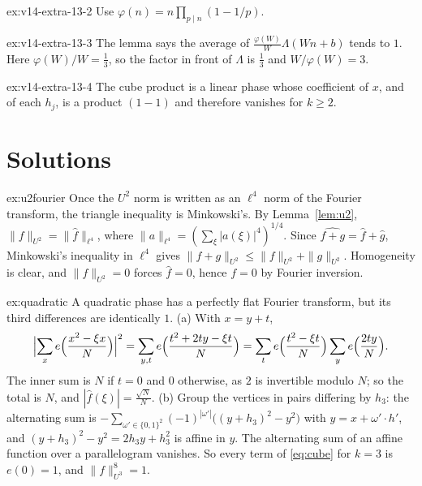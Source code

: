 \begin{hint}{ex:v14-extra-13-2}
Use $\varphi(n)=n\prod_{p\mid n}(1-1/p)$.
\end{hint}

\begin{hint}{ex:v14-extra-13-3}
The lemma says the average of $\frac{\varphi(W)}W\Lambda(Wn+b)$ tends to $1$. Here $\varphi(W)/W=\frac13$, so the factor in front of $\Lambda$ is $\frac13$ and $W/\varphi(W)=3$.
\end{hint}

\begin{hint}{ex:v14-extra-13-4}
The cube product is a linear phase whose coefficient of $x$, and of each $h_j$, is a product $(1-1)$ and therefore vanishes for $k\ge2$.
\end{hint}

\section{Solutions}

\begin{solution}{ex:u2fourier}
\idea Once the $U^2$ norm is written as an $\ell^4$ norm of the Fourier transform, the triangle inequality is Minkowski's.
\writeup By Lemma~\ref{lem:u2}, $\|f\|_{U^2}=\|\hat f\|_{\ell^4}$, where $\|a\|_{\ell^4}=(\sum_\xi|a(\xi)|^4)^{1/4}$. Since $\widehat{f+g}=\hat f+\hat g$, Minkowski's inequality in $\ell^4$ gives $\|f+g\|_{U^2}\le\|f\|_{U^2}+\|g\|_{U^2}$. Homogeneity is clear, and $\|f\|_{U^2}=0$ forces $\hat f=0$, hence $f=0$ by Fourier inversion.
\end{solution}

\begin{solution}{ex:quadratic}
\idea A quadratic phase has a perfectly flat Fourier transform, but its third differences are identically $1$.
\writeup (a) With $x=y+t$,
\[
\Bigl|\sum_xe\Bigl(\frac{x^2-\xi x}N\Bigr)\Bigr|^2=\sum_{y,t}e\Bigl(\frac{t^2+2ty-\xi t}N\Bigr)=\sum_te\Bigl(\frac{t^2-\xi t}N\Bigr)\sum_ye\Bigl(\frac{2ty}N\Bigr).
\]
The inner sum is $N$ if $t=0$ and $0$ otherwise, as $2$ is invertible modulo $N$; so the total is $N$, and $|\hat f(\xi)|=\frac{\sqrt N}N$.
(b) Group the vertices in pairs differing by $h_3$: the alternating sum is $-\sum_{\omega'\in\{0,1\}^2}(-1)^{|\omega'|}\bigl((y+h_3)^2-y^2\bigr)$ with $y=x+\omega'\cdot h'$, and $(y+h_3)^2-y^2=2h_3y+h_3^2$ is affine in $y$. The alternating sum of an affine function over a parallelogram vanishes. So every term of \eqref{eq:cube} for $k=3$ is $e(0)=1$, and $\|f\|_{U^3}^8=1$.
\end{solution}

